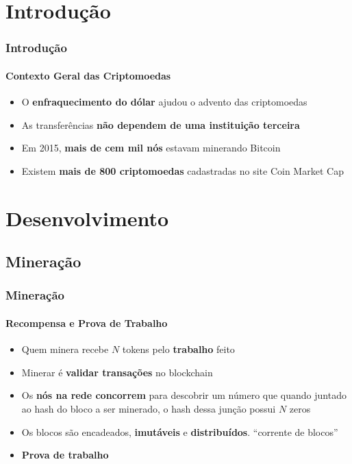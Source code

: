 \documentclass[aspectratio=43]{beamer}
\begin{document}
\section{Introdução}
\begin{frame}
\frametitle{Introdução}
\framesubtitle{Contexto Geral das Criptomoedas}

\begin{itemize}
    \item O \textbf{enfraquecimento do dólar} ajudou o advento das
        criptomoedas 

    \item As transferências \textbf{não dependem de uma instituição
        terceira}

    \item Em 2015, \textbf{mais de cem mil nós} estavam minerando
        Bitcoin 

    \item Existem \textbf{mais de 800 criptomoedas} cadastradas no site Coin
        Market Cap 

\end{itemize}

\end{frame}

\section[Desenvolvi\ldots]{Desenvolvimento}
\subsection{Mineração}

\begin{frame}
    \frametitle{Mineração}
    \framesubtitle{Recompensa e Prova de Trabalho}
    
    \begin{itemize}
        \item Quem minera recebe $N$ tokens pelo \textbf{trabalho} feito
            
        \item Minerar é \textbf{validar transações} no blockchain

        \item Os \textbf{nós na rede concorrem} para descobrir um
            número que quando juntado ao hash do bloco a ser minerado,
            o hash dessa junção possui $N$ zeros

        \item Os blocos são encadeados, \textbf{imutáveis} e
            \textbf{distribuídos}. ``corrente de blocos'' 

        \item \textbf{Prova de trabalho}
    \end{itemize}
\end{frame}
\end{document}
